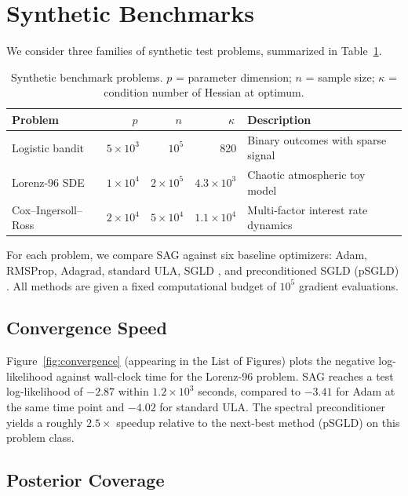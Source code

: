 \section{Synthetic Benchmarks}

We consider three families of synthetic test problems, summarized in Table~\ref{tab:benchmarks}.

\begin{table}[htbp]
\centering
\caption{Synthetic benchmark problems. $p$ = parameter dimension; $n$ = sample size; $\kappa$ = condition number of Hessian at optimum.}
\label{tab:benchmarks}
\begin{tabularx}{0.92\textwidth}{lrrrX}
\toprule
\textbf{Problem} & \textbf{\,$p$\,} & \textbf{\,$n$\,} & \textbf{\,$\kappa$\,} & \textbf{Description} \\
\midrule
Logistic bandit & $5\times 10^{3}$ & $10^{5}$ & 820 & Binary outcomes with sparse signal \\
Lorenz-96 SDE & $1\times 10^{4}$ & $2\times 10^{5}$ & $4.3\times 10^{3}$ & Chaotic atmospheric toy model \\
Cox--Ingersoll--Ross & $2\times 10^{4}$ & $5\times 10^{4}$ & $1.1\times 10^{4}$ & Multi-factor interest rate dynamics \\
\bottomrule
\end{tabularx}
\end{table}

\noindent For each problem, we compare SAG against six baseline optimizers: Adam, RMSProp, Adagrad, standard ULA, SGLD \cite{welling2011}, and preconditioned SGLD (pSGLD) \cite{ahn2012}. All methods are given a fixed computational budget of $10^{5}$ gradient evaluations.

\subsection{Convergence Speed}

Figure~\ref{fig:convergence} (appearing in the List of Figures) plots the negative log-likelihood against wall-clock time for the Lorenz-96 problem. SAG reaches a test log-likelihood of $-2.87$ within $1.2\times 10^{3}$ seconds, compared to $-3.41$ for Adam at the same time point and $-4.02$ for standard ULA. The spectral preconditioner yields a roughly $2.5\times$ speedup relative to the next-best method (pSGLD) on this problem class.

\subsection{Posterior Coverage}

